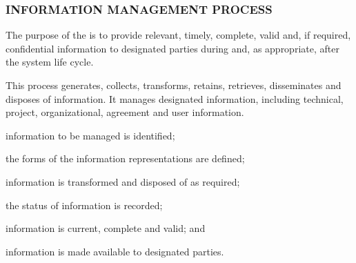 		\newpage
		\subsubsection{INFORMATION MANAGEMENT PROCESS\label{proc:information_management_process}}

			\begin{adjustwidth}{2em}{0pt} 

				The purpose of the  is to provide relevant, timely, complete, valid and, if required, confidential information to designated parties during and, as appropriate, after the system life cycle.

				This process generates, collects, transforms, retains, retrieves, disseminates and disposes of information. It manages designated information, including technical, project, organizational, agreement and user information.

			\end{adjustwidth}

			\begin{adjustwidth}{2em}{0pt} 

				\begin{compactitem}

					\item information to be managed is identified;

					\item the forms of the information representations are defined;

					\item information is transformed and disposed of as required;

					\item the status of information is recorded;

					\item information is current, complete and valid; and

					\item information is made available to designated parties.

				\end{compactitem}

			\end{adjustwidth}


